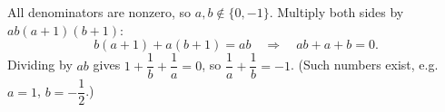 All denominators are nonzero, so $a,b\notin\{0,-1\}$. Multiply both sides by $ab(a+1)(b+1)$:
\[
b(a+1)+a(b+1)=ab\quad\Longrightarrow\quad ab+a+b=0 .
\]
Dividing by $ab$ gives $1+\dfrac{1}{b}+\dfrac{1}{a}=0$, so $\dfrac{1}{a}+\dfrac{1}{b}=\boxed{-1}$. (Such numbers exist, e.g.\ $a=1$, $b=-\dfrac{1}{2}$.)
